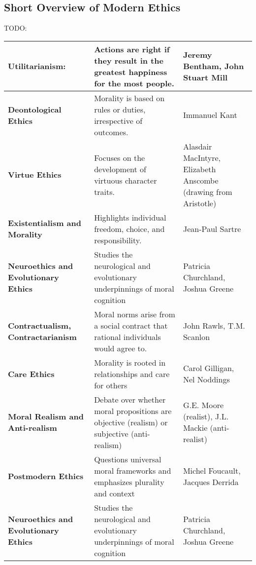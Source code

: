 \documentclass[12pt,a4]{article}
\begin{document}
    \subsection{Short Overview of Modern Ethics}
TODO:
\begin{table}[h!]
    \centering
    \begin{tabular}{p{3cm} p{5cm} p{4cm} } 
    \hline 
 
    \textbf{Utilitarianism:} 
        & Actions are right if they result in the greatest happiness for the most people. 
        & Jeremy Bentham, John Stuart Mill \\ \hline

    \textbf{Deontological Ethics} 
        & Morality is based on rules or duties, irrespective of outcomes.
        & Immanuel Kant \\ \hline
    
    \textbf{Virtue Ethics} 
        & Focuses on the development of virtuous character traits. 
        & Alasdair MacIntyre, Elizabeth Anscombe (drawing from Aristotle)\\ \hline 
    
    \textbf{Existentialism and Morality} 
        & Highlights individual freedom, choice, and responsibility.
        & Jean-Paul Sartre\\ \hline 
        
    \textbf{Neuroethics and Evolutionary Ethics}
        & Studies the neurological and evolutionary underpinnings of moral cognition 
        & Patricia Churchland, Joshua Greene\\ \hline 
         
    \textbf{Contractualism, Contractarianism} 
        & Moral norms arise from a social contract that rational individuals
          would agree to.
        & John Rawls, T.M. Scanlon \\ \hline

    \textbf{Care Ethics} 
        & Morality is rooted in relationships and care for others 
        & Carol Gilligan, Nel Noddings \\ \hline

    \textbf{Moral Realism and Anti-realism }
        & Debate over whether moral propositions are objective (realism) 
        or subjective (anti-realism) 
        & G.E. Moore (realist), J.L. Mackie (anti-realist) \\  \hline
        
    \textbf{Postmodern Ethics} 
        & Questions universal moral frameworks and emphasizes plurality and context 
        & Michel Foucault, Jacques Derrida \\ \hline
        
    \textbf{Neuroethics and Evolutionary Ethics} 
        & Studies the neurological and evolutionary underpinnings of moral cognition 
        & Patricia Churchland, Joshua Greene \\ 
    \hline

    \end{tabular}
    
\end{table}
    
\end{document}
